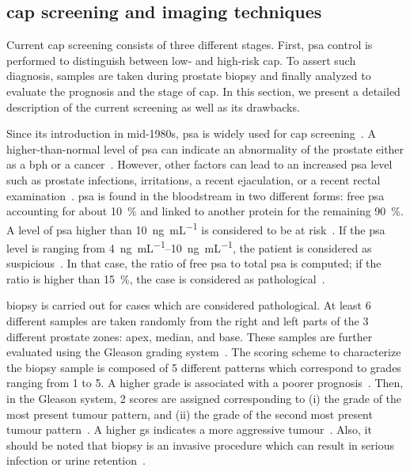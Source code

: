 \subsection{\acs*{cap} screening and imaging techniques}\label{sec:intro:screening}

Current \ac{cap} screening consists of three different stages.
First, \ac{psa} control is performed to distinguish between low- and high-risk
\ac{cap}.
To assert such diagnosis, samples are taken during prostate biopsy and finally
analyzed to evaluate the prognosis and the stage of \ac{cap}.
In this section, we present a detailed description of the current screening as
well as its drawbacks.

Since its introduction in mid-1980s, \ac{psa} is widely used for \ac{cap}
screening~\cite{Etzioni2002}.
A higher-than-normal level of \ac{psa} can indicate an abnormality of the
prostate either as a \ac{bph} or a cancer~\cite{Hoeks2011}.
However, other factors can lead to an increased \ac{psa} level such as prostate
infections, irritations, a recent ejaculation, or a recent rectal
examination~\cite{Parfait2010}.
\ac{psa} is found in the bloodstream in two different forms: free \ac{psa}
accounting for about \SI{10}{\percent} and linked to another protein for the
remaining \SI{90}{\percent}.
A level of \ac{psa} higher than \SI{10}{\nano\gram\per\milli\liter} is
considered to be at risk~\cite{Parfait2010}.
If the \ac{psa} level is ranging from
\SIrange{4}{10}{\nano\gram\per\milli\liter}, the patient is considered as
suspicious~\cite{Barentsz2012}.
In that case, the ratio of free \ac{psa} to total \ac{psa} is computed; if the
ratio is higher than \SI{15}{\percent}, the case is considered as
pathological~\cite{Parfait2010}.

 biopsy is carried out for cases which are considered pathological.
At least 6 different samples are taken randomly from the right and left parts
of the 3 different prostate zones: apex, median, and base.
These samples are further evaluated using the Gleason grading
system~\cite{Gleason1977}.
The scoring scheme to characterize the biopsy sample is composed of 5 different
patterns which correspond to grades ranging from 1 to 5.
A higher grade is associated with a poorer prognosis~\cite{Epstein2005}.
Then, in the Gleason system, 2 scores are assigned corresponding to (i) the
grade of the most present tumour pattern, and (ii) the grade of the second most
present tumour pattern~\cite{Epstein2005}.
A higher \ac{gs} indicates a more aggressive tumour~\cite{Epstein2005}.
Also, it should be noted that biopsy is an invasive procedure which can result
in serious infection or urine retention~\cite{Hara2005,Chou2011}.

